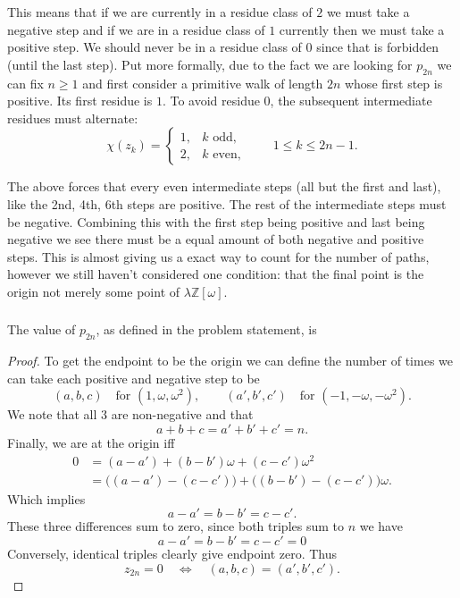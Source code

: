 \documentclass[11pt]{scrartcl}
\begin{document}
\begin{soln}
	This means that if we are currently in a residue class of $2$ we must take a negative step and if we are in a residue class of $1$ currently then we must take a positive step. We should never be in a residue class of $0$ since that is forbidden (until the last step).
	Put more formally, due to the fact we are looking for $p_{2n}$ we can fix $n\ge1$ and first consider a primitive walk of length $2n$ whose first step is positive. Its first residue is $1$. To avoid residue $0$,
	the subsequent intermediate residues must alternate:
	\[
	\chi(z_k)=
	\begin{cases}
		1,& k\text{ odd},\\
		2,& k\text{ even},
	\end{cases}
	\qquad 1\le k\le2n-1.
	\]
    

	The above forces that every even intermediate steps (all but the first and last), like the 2nd, 4th, 6th steps are positive. 
    The rest of the intermediate steps must be negative. Combining this with the first step being positive and last being negative we see 
    there must be a equal amount of both negative and positive steps.
    This is almost giving us a exact way to count for the number of paths,
     however we still haven't considered one condition: that the final point is the origin
	not merely some point of $\lambda\mathbb Z[\omega]$.
	
	\subsubsection*{}
		
	\begin{claim*}
		The value of $p_{2n}$, as defined in the problem statement, is 	
	\end{claim*}
	\begin{proof}
		
		To get the endpoint to be the origin we can define the number of times we can take each positive and negative step to be
		\[
		(a,b,c)\quad\text{for }(1,\omega,\omega^2),
		\qquad
		(a',b',c')\quad\text{for }(-1,-\omega,-\omega^2).
		\]
		We note that all $3$ are non-negative and that
		\[
		a+b+c=a'+b'+c'=n.
		\]
		Finally, we are at the origin iff
		\begin{align*}
			0
			&=(a-a')+(b-b')\omega+(c-c')\omega^2\\
			&=\bigl((a-a')-(c-c')\bigr)
			+\bigl((b-b')-(c-c')\bigr)\omega.
		\end{align*}
		Which implies
		\[
		a-a'=b-b'=c-c'.
		\]
		These three differences sum to zero, since both triples sum to $n$ we have 		\[
		a-a'=b-b'=c-c'=0
		\]
		Conversely, identical triples clearly
		give endpoint zero. Thus
		\[
		z_{2n}=0
		\quad\Longleftrightarrow\quad
		(a,b,c)=(a',b',c').
		\]
		


\end{proof}
\end{soln}
\end{document}
